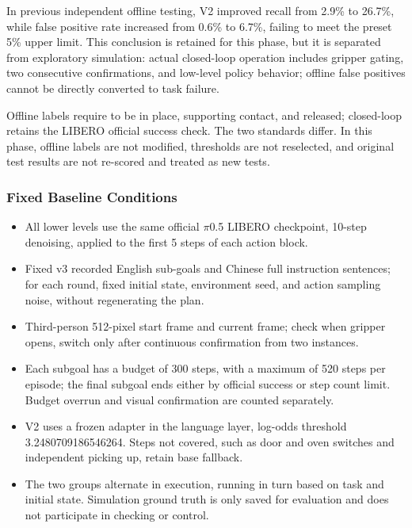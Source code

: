 In previous independent offline testing, V2 improved recall from 2.9\% to 26.7\%, while false positive rate increased from 0.6\% to 6.7\%, failing to meet the preset 5\% upper limit. This conclusion is retained for this phase, but it is separated from exploratory simulation: actual closed-loop operation includes gripper gating, two consecutive confirmations, and low-level policy behavior; offline false positives cannot be directly converted to task failure.

Offline labels require to be in place, supporting contact, and released; closed-loop retains the LIBERO official success check. The two standards differ. In this phase, offline labels are not modified, thresholds are not reselected, and original test results are not re-scored and treated as new tests.

\subsubsection{Fixed Baseline Conditions}\label{s12-detail-3}

\begin{itemize}
\tightlist
\item
  All lower levels use the same official \(\pi\)0.5 LIBERO checkpoint, 10-step denoising, applied to the first 5 steps of each action block.
\item
  Fixed v3 recorded English sub-goals and Chinese full instruction sentences; for each round, fixed initial state, environment seed, and action sampling noise, without regenerating the plan.
\item
  Third-person 512-pixel start frame and current frame; check when gripper opens, switch only after continuous confirmation from two instances.
\item
  Each subgoal has a budget of 300 steps, with a maximum of 520 steps per episode; the final subgoal ends either by official success or step count limit. Budget overrun and visual confirmation are counted separately.
\item
  V2 uses a frozen adapter in the language layer, log-odds threshold 3.2480709186546264. Steps not covered, such as door and oven switches and independent picking up, retain base fallback.
\item
  The two groups alternate in execution, running in turn based on task and initial state. Simulation ground truth is only saved for evaluation and does not participate in checking or control.
\end{itemize}

